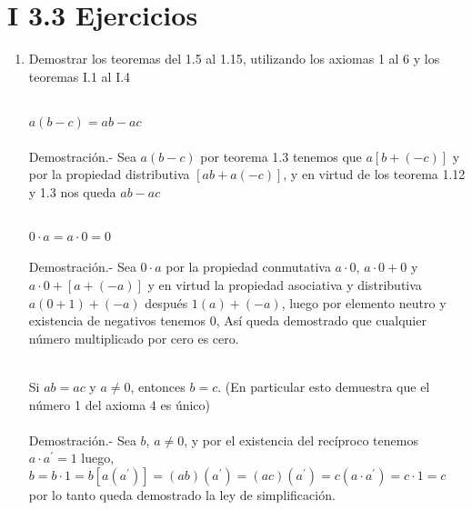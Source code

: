 \section*{I 3.3 Ejercicios}
\begin{enumerate}

\item Demostrar los teoremas del 1.5 al 1.15, utilizando los axiomas 1 al 6 y los teoremas I.1 al I.4\\\\

\begin{teo}
$a(b-c)=ab-ac$\\\\
Demostración.- \;
Sea $a(b-c)$ por teorema 1.3 tenemos que $a\left[ b+(-c)\right]$  y por la propiedad distributiva $\left[ ab + a(-c) \right]$, y en virtud de los teorema 1.12 y 1.3 nos queda $ ab - ac $ \\\\
\end{teo}

\begin{teo}
$0\cdot a = a\cdot 0 =0$\\\\
Demostración.- \;
Sea $0\cdot a$ por la propiedad conmutativa $a\cdot 0$, $a\cdot 0 + 0$ y $a\cdot 0 + \left[a+(-a) \right]$ y en virtud la propiedad asociativa y distributiva $a(0 + 1)+(-a)$ después $1(a)+(-a)$, luego por elemento neutro y existencia de negativos tenemos $0$, Así queda demostrado que cualquier número multiplicado por cero es cero.\\\\ 
\end{teo}

\begin{teo} Si $ab=ac$ y $a \neq 0$, entonces $b=c$. (En particular esto demuestra que el número 1 del axioma 4 es único)\\\\
Demostración.- \;
Sea $b$, $a\neq 0$, y por el existencia del recíproco tenemos $a\cdot a^{'}=1 $  luego,  $b=b\cdot 1=b\left[a(a^{'})\right]=(ab)(a^{'})=(ac)(a^{'})=c(a\cdot a^{'})=c\cdot 1=c$ por lo tanto queda demostrado la ley de simplificación.\\\\
\end{teo}


\end{enumerate}
